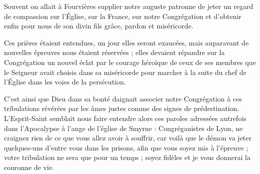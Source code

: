 Souvent on allait à Fourvières supplier notre auguste patronne de jeter un regard de compassion sur l'Église, sur la France, sur notre Congrégation et d'obtenir enfin pour nous
de son divin fils grâce, pardon et miséricorde.

Ces prières étaient entendues, un jour elles seront exaucées, mais auparavant de nouvelles épreuves nous étaient réservées ; elles devaient répandre sur la Congrégation un nouvel éclat par le courage héroïque de ceux de ses membres que le Seigneur avait choisis dans sa miséricorde pour marcher à la suite du chef de l'Église dans les voies de la persécution.

C'est ainsi que Dieu dans sa bonté daignait associer notre Congrégation à ces tribulations révérées par les âmes justes comme des signes de prédestination. L'Esprit-Saint semblait nous faire entendre alors ces paroles adressées autrefois dans l'Apocalypse à l'ange de l'église de Smyrne : Congréganistes de Lyon, ne craignez rien de ce que vous allez avoir à souffrir, car voilà que le démon va jeter quelques-uns d'entre vous dans les prisons, afin que vous soyez mis à l'épreuve ; votre tribulation ne sera que pour un temps ; soyez fidèles et je vous donnerai la couronne de vie.
